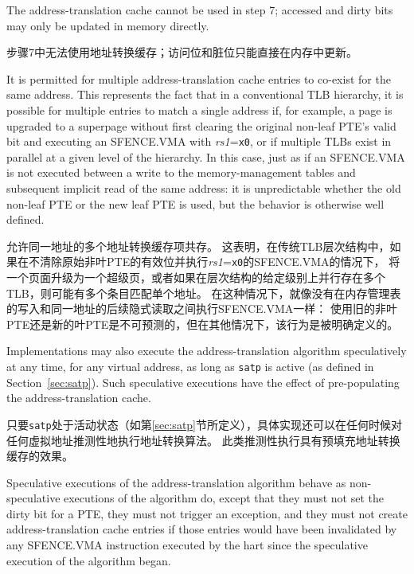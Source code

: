The address-translation cache cannot be used in step 7; accessed and
dirty bits may only be updated in memory directly.

步骤7中无法使用地址转换缓存；访问位和脏位只能直接在内存中更新。

\begin{commentary}
  It is permitted for multiple address-translation cache entries to co-exist
  for the same address.  This represents the fact that in a conventional TLB
  hierarchy, it is possible for multiple entries to match a single address if, for
  example, a page is upgraded to a superpage without first clearing the
  original non-leaf PTE's valid bit and executing an SFENCE.VMA with {\em
  rs1}={\tt x0}, or if multiple TLBs exist in parallel at a given level of the
  hierarchy.  In this case, just as if an SFENCE.VMA is not executed between
  a write to the memory-management tables and subsequent implicit read of the
  same address: it is unpredictable whether the old non-leaf PTE or the new leaf
  PTE is used, but the behavior is otherwise well defined.

  允许同一地址的多个地址转换缓存项共存。
  这表明，在传统TLB层次结构中，如果在不清除原始非叶PTE的有效位并执行{\em rs1}={\tt x0}的SFENCE.VMA的情况下，
  将一个页面升级为一个超级页，或者如果在层次结构的给定级别上并行存在多个TLB，则可能有多个条目匹配单个地址。
  在这种情况下，就像没有在内存管理表的写入和同一地址的后续隐式读取之间执行SFENCE.VMA一样：
  使用旧的非叶PTE还是新的叶PTE是不可预测的，但在其他情况下，该行为是被明确定义的。
\end{commentary}
Implementations may also execute the address-translation algorithm
speculatively at any time, for any virtual address, as long as {\tt satp} is
active (as defined in Section~\ref{sec:satp}).  Such speculative executions
have the effect of pre-populating the address-translation cache.

只要{\tt satp}处于活动状态（如第\ref{sec:satp}节所定义），具体实现还可以在任何时候对任何虚拟地址推测性地执行地址转换算法。
此类推测性执行具有预填充地址转换缓存的效果。

Speculative executions of the address-translation algorithm behave as
non-speculative executions of the algorithm do, except that they must not set the
dirty bit for a PTE, they must not trigger an exception, and they must not create
address-translation cache entries if those entries would have been invalidated
by any SFENCE.VMA instruction executed by the hart since the speculative
execution of the algorithm began.

